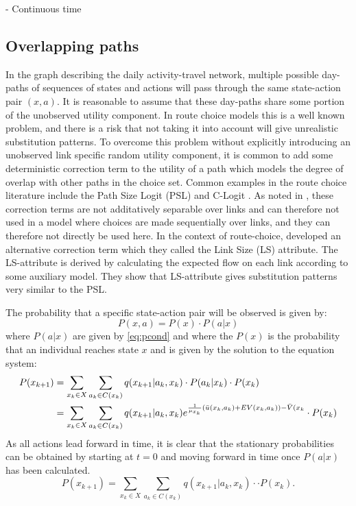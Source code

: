 - Continuous time 

\subsection{Overlapping paths}
In the graph describing the daily activity-travel network, multiple possible day-paths of sequences of states and actions will pass through the same state-action pair $(x,a)$. It is reasonable to assume that these day-paths share some portion of the unobserved utility component. In route choice models this is a well known problem, and there is a risk that not taking it into account will give unrealistic substitution patterns. To overcome this problem without explicitly introducing an unobserved link specific random utility component, it is common to add some deterministic correction term to the utility of a path which models the degree of overlap with other paths in the choice set. Common examples in the route choice literature include the Path Size Logit (PSL) \citep[][]{} and C-Logit \citep{}. As noted in \citet{fosgerau2013}, these correction terms are not additatively separable over links and can therefore not used in a model where choices are made sequentially over links, and they can therefore not directly be used here. In the context of route-choice, \citet{fosgerau2013} developed an alternative correction term which they called the Link Size (LS) attribute. The LS-attribute is derived by calculating the expected flow on each link according to some auxiliary model. They show that LS-attribute gives substitution patterns very similar to the PSL.

The probability that a specific state-action pair will be observed is given by:
\begin{equation}
P(x,a) = P(x)\cdot P(a|x)
\end{equation}
where $P(a|x)$ are given by \eqref{eq:pcond} and where the $P(x)$ is the probability that an individual reaches state $x$ and is given by the solution to the equation system:
\begin{align}
P(x_{k+1}) &= \sum_{x_k \in X} \sum_{a_k \in C(x_k)}q(x_{k+1}|a_k,x_k)\cdot P(a_k|x_k)\cdot P(x_k) \\
&=\sum_{x_k \in X} \sum_{a_k \in C(x_k)}q(x_{k+1}|a_k,x_k) e^{\frac{1}{\mu_{x_k}}\left(\bar{u}(x_k,a_k) + \eutil(x_k,a_k)\right) - \ev(x_k}
\cdot P(x_k)
\end{align}
As all actions lead forward in time, it is clear that the stationary probabilities can be obtained by starting at $t=0$ and moving forward in time once $P(a|x)$ has been calculated. 
\begin{equation}
P(x_{k+1}) = \sum_{x_k \in X} \sum_{a_k \in C(x_k)}q(x_{k+1}|a_k,x_k)\cdot \cdot P(x_k).
\end{equation}

